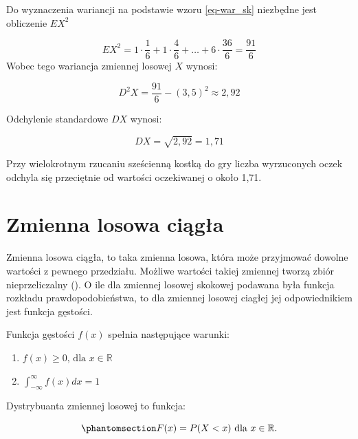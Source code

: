 \documentclass[
  letterpaper,
  DIV=11,
  numbers=noendperiod]{scrreprt}
\begin{document}
Do wyznaczenia wariancji na podstawie wzoru \ref{eq-war_sk} niezbędne
jest obliczenie \(EX^2\)

\[EX^2=1 \cdot \frac{1}{6}+1 \cdot \frac{4}{6}+ \ldots +6 \cdot \frac{36}{6} = \frac{91}{6}\]
Wobec tego wariancja zmiennej losowej \(X\) wynosi:

\[ D^2X=\frac{91}{6}-(3,5)^2 \approx 2,92\]

Odchylenie standardowe \(DX\) wynosi:

\[DX=\sqrt{2,92}=1,71\]

Przy wielokrotnym rzucaniu sześcienną kostką do gry liczba wyrzuconych
oczek odchyla się przeciętnie od wartości oczekiwanej o około 1,71.

\begin{tcolorbox}[enhanced jigsaw, toprule=.15mm, title={Stop}, breakable, coltitle=black, titlerule=0mm, colbacktitle=quarto-callout-tip-color!10!white, opacitybacktitle=0.6, opacityback=0, bottomtitle=1mm, left=2mm, arc=.35mm, leftrule=.75mm, bottomrule=.15mm, rightrule=.15mm, toptitle=1mm, colframe=quarto-callout-tip-color-frame, colback=white]

\end{tcolorbox}

\section{Zmienna losowa ciągła}\label{zmienna-losowa-ciux105gux142a}

Zmienna losowa ciągła, to taka zmienna losowa, która może przyjmować
dowolne wartości z pewnego przedziału. Możliwe wartości takiej zmiennej
tworzą zbiór nieprzeliczalny (). O ile dla zmiennej losowej skokowej podawana była funkcja
rozkładu prawdopodobieństwa, to dla zmiennej losowej ciagłej jej
odpowiednikiem jest funkcja gęstości.

Funkcja gęstości \(f(x)\) spełnia następujące warunki:

\begin{enumerate}
\def\labelenumi{\arabic{enumi}.}
\item
  \(f(x) \ge 0 \text{, dla } x \in \mathbb{R}\)
\item
  \(\int_{-\infty}^{\infty}f(x)dx= 1\)
\end{enumerate}

Dystrybuanta zmiennej losowej to funkcja:

\begin{equation}\phantomsection\label{eq-dys_og}{ F(x) = P(X <x) \text{ dla } x \in \mathbb{R}.}\end{equation}
\end{document}
